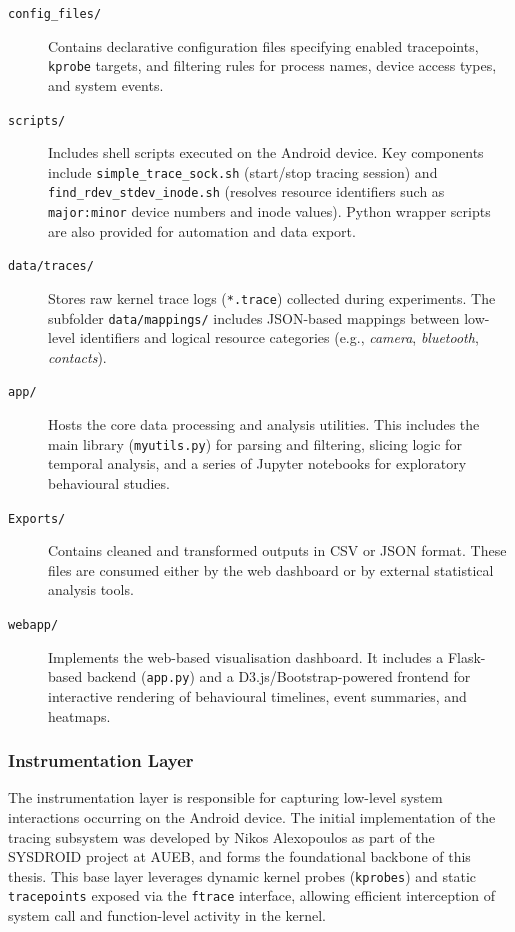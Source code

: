 \documentclass[a4paper,12pt]{report}
\begin{document}
\begin{description}
  \item[\texttt{config\_files/}] Contains declarative configuration files specifying enabled tracepoints, \texttt{kprobe} targets, and filtering rules for process names, device access types, and system events.

  \item[\texttt{scripts/}] Includes shell scripts executed on the Android device. Key components include \texttt{simple\_trace\_sock.sh} (start/stop tracing session) and \texttt{find\_rdev\_stdev\_inode.sh} (resolves resource identifiers such as \texttt{major:minor} device numbers and inode values). Python wrapper scripts are also provided for automation and data export.

  \item[\texttt{data/traces/}] Stores raw kernel trace logs (\texttt{*.trace}) collected during experiments. The subfolder \texttt{data/mappings/} includes JSON-based mappings between low-level identifiers and logical resource categories (e.g., \emph{camera}, \emph{bluetooth}, \emph{contacts}).

  \item[\texttt{app/}] Hosts the core data processing and analysis utilities. This includes the main library (\texttt{myutils.py}) for parsing and filtering, slicing logic for temporal analysis, and a series of Jupyter notebooks for exploratory behavioural studies.

  \item[\texttt{Exports/}] Contains cleaned and transformed outputs in CSV or JSON format. These files are consumed either by the web dashboard or by external statistical analysis tools.

  \item[\texttt{webapp/}] Implements the web-based visualisation dashboard. It includes a Flask-based backend (\texttt{app.py}) and a D3.js/Bootstrap-powered frontend for interactive rendering of behavioural timelines, event summaries, and heatmaps.
\end{description}


\subsubsection{Instrumentation Layer}

The instrumentation layer is responsible for capturing low-level system interactions occurring on the Android device. The initial implementation of the tracing subsystem was developed by Nikos Alexopoulos as part of the SYSDROID project at AUEB, and forms the foundational backbone of this thesis. This base layer leverages dynamic kernel probes (\texttt{kprobes}) and static \texttt{tracepoints} exposed via the \texttt{ftrace} interface, allowing efficient interception of system call and function-level activity in the kernel.
\end{document}
